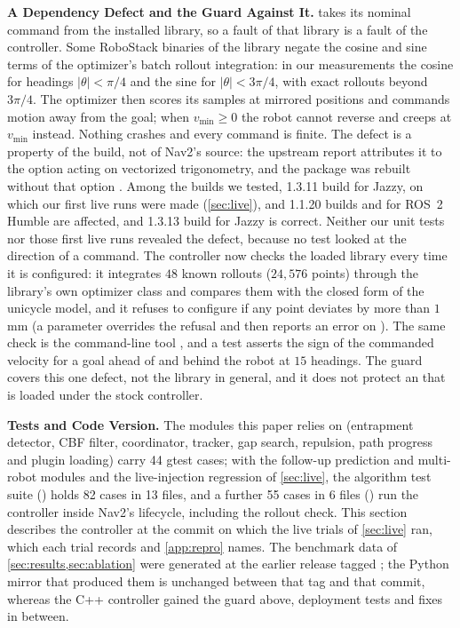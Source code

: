 \noindent\textbf{A Dependency Defect and the Guard Against It.} \sname{} takes its nominal command from the installed  library, so a fault of that library is a fault of the controller. Some RoboStack binaries of the library negate the cosine and sine terms of the optimizer's batch rollout integration: in our measurements the cosine for headings $|\theta|<\pi/4$ and the sine for $|\theta|<3\pi/4$, with exact rollouts beyond $3\pi/4$. The optimizer then scores its samples at mirrored positions and commands motion away from the goal; when $v_{\min}\ge0$ the robot cannot reverse and creeps at $v_{\min}$ instead. Nothing crashes and every command is finite. The defect is a property of the build, not of Nav2's source: the upstream report attributes it to the  option acting on vectorized trigonometry, and the package was rebuilt without that option \citep{robostack_290}. Among the builds we tested,  1.3.11 build  for Jazzy, on which our first live runs were made (\cref{sec:live}), and 1.1.20 builds  and  for ROS~2 Humble are affected, and 1.3.13 build  for Jazzy is correct. Neither our unit tests nor those first live runs revealed the defect, because no test looked at the direction of a command. The controller now checks the loaded library every time it is configured: it integrates $48$ known rollouts ($24{,}576$ points) through the library's own optimizer class and compares them with the closed form of the unicycle model, and it refuses to configure if any point deviates by more than $1$\,mm (a parameter overrides the refusal and then reports an error on ). The same check is the command-line tool , and a test asserts the sign of the commanded velocity for a goal ahead of and behind the robot at $15$ headings. The guard covers this one defect, not the library in general, and it does not protect an  that is loaded under the stock controller.

\noindent\textbf{Tests and Code Version.} The modules this paper relies on (entrapment detector, CBF filter, coordinator, tracker, gap search, repulsion, path progress and plugin loading) carry 44 gtest cases; with the follow-up prediction and multi-robot modules and the live-injection regression of \cref{sec:live}, the algorithm test suite () holds 82  cases in 13 files, and a further 55 cases in 6 files () run the controller inside Nav2's lifecycle, including the rollout check. This section describes the controller at the commit on which the live trials of \cref{sec:live} ran, which each trial records and \cref{app:repro} names. The benchmark data of \cref{sec:results,sec:ablation} were generated at the earlier release tagged ; the Python mirror that produced them is unchanged between that tag and that commit, whereas the C++ controller gained the guard above, deployment tests and fixes in between.
